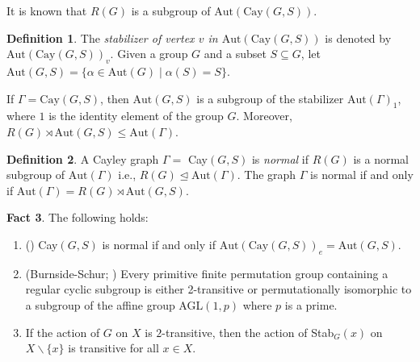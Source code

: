 \documentclass[12pt,reqno,a4paper]{amsart}
\theoremstyle{definition}
\newtheorem{defn}{Definition}[section]
\newtheorem{fact}[defn]{Fact}
\begin{document}
It is known that $R(G)$ is a subgroup of $\mathrm{Aut}(\mathrm{Cay}(G,S))$.

\begin{defn}\label{Definition 2.7}
The {\em stabilizer of vertex $v$ in $\mathrm{Aut}(\mathrm{Cay}(G,S))$} is denoted by $\mathrm{Aut}(\mathrm{Cay}(G,S))_v$. 
Given a group $G$ and a subset $S \subseteq G$, let 
$\mathrm{Aut}(G,S) = \{\alpha \in \mathrm{Aut}(G) \mid \alpha(S) = S\}$.
\end{defn}

If $\Gamma = \mathrm{Cay}(G, S)$, then $\mathrm{Aut}(G,S)$ is a subgroup of the stabilizer $\mathrm{Aut}(\Gamma)_{1}$, where $1$ is the identity element of the group $G$. Moreover, $R(G)\rtimes \mathrm{Aut}(G,S)\le \mathrm{Aut}(\Gamma)$.

\begin{defn}\label{Definition 2.8}
A Cayley graph $\Gamma=$ Cay$(G,S)$ is {\em normal} if $R(G)$ is a normal subgroup of $\mathrm{Aut}(\Gamma)$ i.e., $R(G)\trianglelefteq \mathrm{Aut}(\Gamma)$. The graph $\Gamma$ is normal if and only if $\mathrm{Aut}(\Gamma)=R(G) \rtimes \mathrm{Aut}(G,S)$.
\end{defn}

\begin{fact}\label{Fact 2.9} 
The following holds:
    \begin{enumerate}
        \item (\cite{HHL2017}) Cay$(G,S)$ is normal if and only if $\mathrm{Aut}(\mathrm{Cay}(G,S))_{e} = \mathrm{Aut}(G,S)$.
        \item (Burnside-Schur; \cite{EP2005}) Every primitive finite permutation group containing a regular cyclic subgroup is either 2-transitive or permutationally isomorphic to a subgroup of the affine group AGL$(1,p)$ where $p$ is a prime.
        
        
        \item If the action of $G$ on $X$ is $2$-transitive, then the action of Stab$_{G}(x)$ on $X\backslash \{x\}$ is transitive for all $x\in X$.
    \end{enumerate}
\end{fact}
\end{document}
